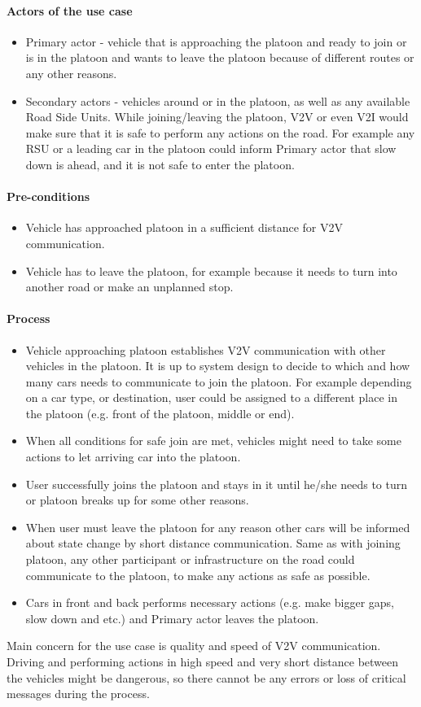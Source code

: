 \paragraph{Actors of the use case}
\begin{itemize}[noitemsep]
    \item Primary actor - vehicle that is approaching the platoon and ready to join or is in the platoon and wants to leave the platoon because of different routes or any other reasons.
    \item Secondary actors - vehicles around or in the platoon, as well as any available Road Side Units. While joining/leaving the platoon, V2V or even V2I would make sure that it is safe to perform any actions on the road. For example any RSU or a leading car in the platoon could inform Primary actor that slow down is ahead, and it is not safe to enter the platoon.
\end{itemize}
% 
\paragraph{Pre-conditions}
\begin{itemize}[noitemsep]
    \item Vehicle has approached platoon in a sufficient distance for V2V communication.
    \item Vehicle has to leave the platoon, for example because it needs to turn into another road or make an unplanned stop.
\end{itemize}
% 
\paragraph{Process}
\begin{itemize}[noitemsep]
    \item Vehicle approaching platoon establishes V2V communication with other vehicles in the platoon. It is up to system design to decide to which and how many cars needs to communicate to join the platoon. For example depending on a car type, or destination, user could be assigned to a different place in the platoon (e.g. front of the platoon, middle or end).
    \item When all conditions for safe join are met, vehicles might need to take some actions to let arriving car into the platoon.
    \item User successfully joins the platoon and stays in it until he/she needs to turn or platoon breaks up for some other reasons.
    \item When user must leave the platoon for any reason other cars will be informed about state change by short distance communication. Same as with joining platoon, any other participant or infrastructure on the road could communicate to the platoon, to make any actions as safe as possible.
    \item Cars in front and back performs necessary actions (e.g. make bigger gaps, slow down and etc.) and Primary actor leaves the platoon.
\end{itemize}
% 
Main concern for the use case is quality and speed of V2V communication. Driving and performing actions in high speed and very short distance between the vehicles might be dangerous, so there cannot be any errors or loss of critical messages during the process.